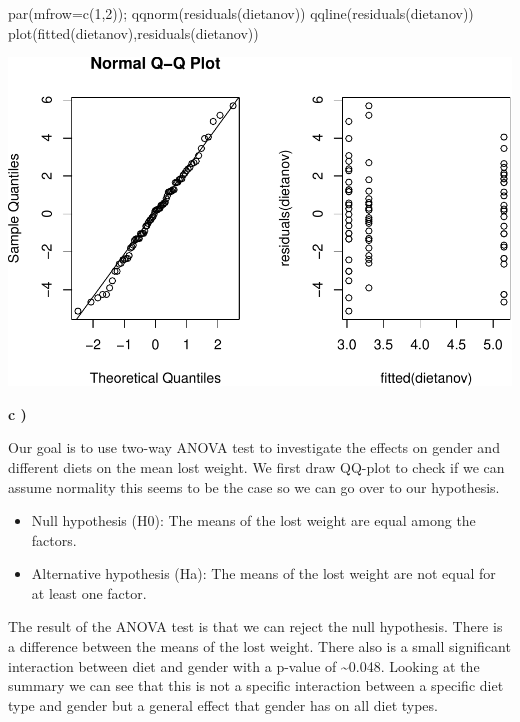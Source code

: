 \documentclass[
]{article}
\newenvironment{Shaded}{\begin{snugshade}}{\end{snugshade}}
\newcommand{\AttributeTok}[1]{\textcolor[rgb]{0.77,0.63,0.00}{#1}}
\newcommand{\DecValTok}[1]{\textcolor[rgb]{0.00,0.00,0.81}{#1}}
\newcommand{\FunctionTok}[1]{\textcolor[rgb]{0.00,0.00,0.00}{#1}}
\newcommand{\NormalTok}[1]{#1}
\begin{document}
\begin{Shaded}
\begin{Highlighting}[]
\FunctionTok{par}\NormalTok{(}\AttributeTok{mfrow=}\FunctionTok{c}\NormalTok{(}\DecValTok{1}\NormalTok{,}\DecValTok{2}\NormalTok{)); }\FunctionTok{qqnorm}\NormalTok{(}\FunctionTok{residuals}\NormalTok{(dietanov))}
\FunctionTok{qqline}\NormalTok{(}\FunctionTok{residuals}\NormalTok{(dietanov))}
\FunctionTok{plot}\NormalTok{(}\FunctionTok{fitted}\NormalTok{(dietanov),}\FunctionTok{residuals}\NormalTok{(dietanov))}
\end{Highlighting}
\end{Shaded}

\includegraphics{assignment_1_files/figure-latex/unnamed-chunk-22-1.pdf}

\textbf{c )}

Our goal is to use two-way ANOVA test to investigate the effects on
gender and different diets on the mean lost weight. We first draw
QQ-plot to check if we can assume normality this seems to be the case so
we can go over to our hypothesis.

\begin{itemize}
\item
  Null hypothesis (H0): The means of the lost weight are equal among the
  factors.
\item
  Alternative hypothesis (Ha): The means of the lost weight are not
  equal for at least one factor.
\end{itemize}

The result of the ANOVA test is that we can reject the null hypothesis.
There is a difference between the means of the lost weight. There also
is a small significant interaction between diet and gender with a
p-value of \textasciitilde0.048. Looking at the summary we can see that
this is not a specific interaction between a specific diet type and
gender but a general effect that gender has on all diet types.
\end{document}
